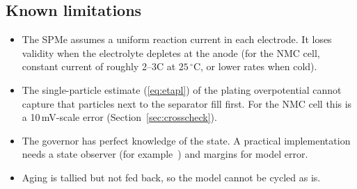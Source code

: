 \documentclass[11pt]{article}
\begin{document}
\subsection{Known limitations}
\begin{itemize}[leftmargin=*]
\item The SPMe assumes a uniform reaction current in each electrode. It loses validity when the electrolyte depletes at the anode (for the NMC cell, constant current of roughly 2--3C at $25\,^\circ$C, or lower rates when cold).
\item The single-particle estimate (\ref{eq:etapl}) of the plating overpotential cannot capture that particles next to the separator fill first. For the NMC cell this is a 10\,mV-scale error (Section~\ref{sec:crosscheck}).
\item The governor has perfect knowledge of the state. A practical implementation needs a state observer (for example~\cite{moura2017}) and margins for model error.
\item Aging is tallied but not fed back, so the model cannot be cycled as is.
\end{itemize}
\end{document}
